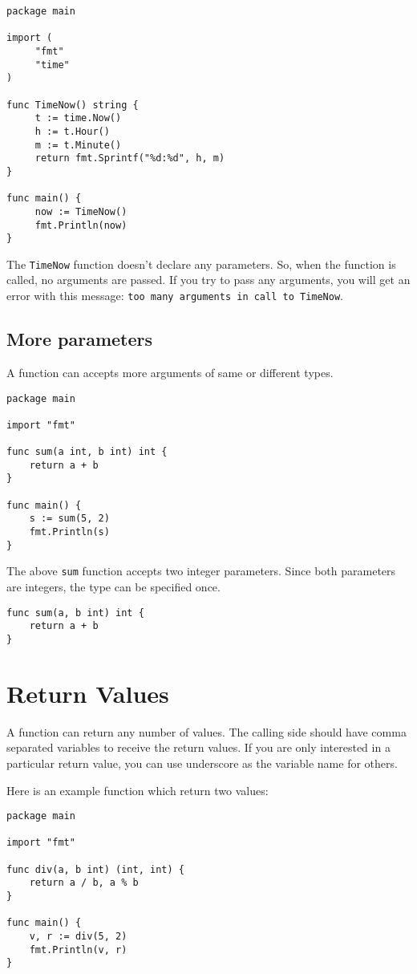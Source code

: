 \begin{lstlisting}
package main

import (
     "fmt"
     "time"
)

func TimeNow() string {
     t := time.Now()
     h := t.Hour()
     m := t.Minute()
     return fmt.Sprintf("%d:%d", h, m)
}

func main() {
     now := TimeNow()
     fmt.Println(now)
}
\end{lstlisting}

The \texttt{TimeNow} function doesn't declare any parameters.  So,
when the function is called, no arguments are passed.  If you try to
pass any arguments, you will get an error with this
message: \texttt{too many arguments in call to TimeNow}.

\subsection{More parameters}

A function can accepts more arguments of same or different types.

\begin{lstlisting}
package main

import "fmt"

func sum(a int, b int) int {
    return a + b
}

func main() {
    s := sum(5, 2)
    fmt.Println(s)
}
\end{lstlisting}

The above \texttt{sum} function accepts two integer parameters.  Since
both parameters are integers, the type can be specified once.

\begin{lstlisting}[numbers=none]
func sum(a, b int) int {
    return a + b
}
\end{lstlisting}

\section{Return Values}

A function can return any number of values.  The calling
side should have comma separated variables to receive the return
values.  If you are only interested in a particular return value, you
can use underscore as the variable name for others.

Here is an example function which return two values:

\begin{lstlisting}
package main

import "fmt"

func div(a, b int) (int, int) {
    return a / b, a % b
}

func main() {
    v, r := div(5, 2)
    fmt.Println(v, r)
}
\end{lstlisting}

